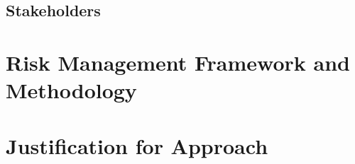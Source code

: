 

\subsection{Stakeholders}


\section{Risk Management Framework and Methodology}




\section{Justification for Approach}

